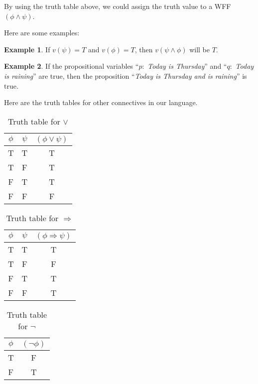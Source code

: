 \documentclass[11pt]{article}
\theoremstyle{definition}
\newtheorem{eg}{Example}
\begin{document}
By using the truth table above, we could assign the truth value to a WFF $(\phi \wedge \psi)$.

Here are some examples:

\begin{eg}
    If $v(\psi)=T$ and $v(\phi)=T$, then $v(\psi \wedge \phi)$ will be $T$.
\end{eg}

\begin{eg}
    If the propositional variables ``$p:$ \textit{Today is Thursday}'' and ``$q:$ \textit{Today is raining}'' are true, then the proposition ``\textit{Today is Thursday and is raining}'' is true.
\end{eg}

Here are the truth tables for other connectives in our language.
\begin{table}[H]
    \centering
    \begin{tabular}{|c|c|c|}
    \hline
    \textbf{$\phi$} & \textbf{$\psi$} & \textbf{$(\phi \vee \psi)$} \\ \hline
    T          & T          & T          \\ \hline
    T          & F          & T          \\ \hline
    F          & T          & T          \\ \hline
    F          & F          & F          \\ \hline
    \end{tabular}
    \caption[]{Truth table for $\vee$}
\end{table}

\begin{table}[H]
    \centering
    \begin{tabular}{|c|c|c|}
    \hline
    \textbf{$\phi$} & \textbf{$\psi$} & \textbf{$(\phi \Rightarrow \psi)$} \\ \hline
    T          & T          & T          \\ \hline
    T          & F          & F          \\ \hline
    F          & T          & T          \\ \hline
    F          & F          & T          \\ \hline
    \end{tabular}
    \caption[]{Truth table for $\Rightarrow$}
\end{table}

\begin{table}[H]
    \centering
    \begin{tabular}{|c|c|}
    \hline
    \textbf{$\phi$} & \textbf{$(\neg \phi)$} \\ \hline
    T          & F          \\ \hline
    F          & T          \\ \hline
    \end{tabular}
    \caption[]{Truth table for $\neg$}
\end{table}
\end{document}
